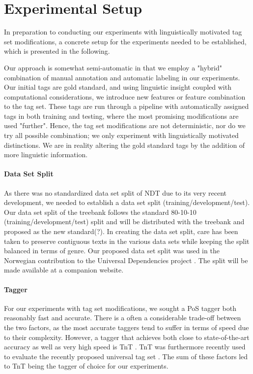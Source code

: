 \documentclass[11pt,a4paper]{article}
\begin{document}
\section{Experimental Setup}
\label{sec:setup}
In preparation to conducting our experiments with linguistically motivated tag
set modifications, a concrete setup for the experiments needed to be
established, which is presented in the following.

Our approach is somewhat semi-automatic in that we employ a "hybrid"
combination of manual annotation and automatic labeling in our experiments. Our
initial tags are gold standard, and using linguistic insight coupled with
computational considerations, we introduce new features or feature combination
to the tag set. These tags are run through a pipeline with automatically
assigned tags in both training and testing, where the most promising
modifications are used "further". Hence, the tag set modifications are not
deterministic, nor do we try all possible combination; we only experiment with
linguistically motivated distinctions. We are in reality altering the gold
standard tags by the addition of more linguistic information.

\paragraph{Data Set Split}
As there was no standardized data set split of NDT due to its very recent
development, we needed to establish a data set split
(training/development/test). Our data set split of the treebank follows the
standard 80-10-10 (training/development/test) split and will be distributed
with the treebank and proposed as the new standard(?). In creating the data set
split, care has been taken to preserve contiguous texts in the various data
sets while keeping the split balanced in terms of genre. Our
proposed data set split was used in the Norwegian contribution to the Universal
Dependencies project \cite{Ovr:Hoh:16}.  The split will be made available at a
companion website.

\paragraph{Tagger}
For our experiments with tag set modifications, we sought a PoS tagger both
reasonably fast and accurate. There is a often a considerable trade-off between
the two factors, as the most accurate taggers tend to suffer in terms of speed
due to their complexity. However, a tagger that achieves both close to
state-of-the-art accuracy as well as very high speed is TnT \cite{Bra:00}. TnT
was furthermore recently used to evaluate the recently proposed universal tag
set \cite{Pet:Das:McD:12}. The sum of these factors led to TnT being the tagger
of choice for our experiments.
\end{document}
